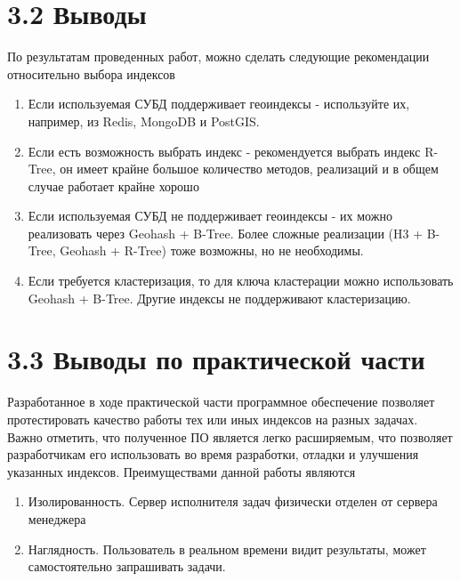 \section{3.2 Выводы}
По результатам проведенных работ, можно сделать следующие рекомендации относительно выбора индексов
\begin{enumerate}
    \item Если используемая СУБД поддерживает геоиндексы - используйте их, например, из Redis, MongoDB и PostGIS.
    \item Если есть возможность выбрать индекс - рекомендуется выбрать индекс R-Tree, он имеет крайне большое количество методов, реализаций и в общем случае работает крайне хорошо
    \item Если используемая СУБД не поддерживает геоиндексы - их можно реализовать через Geohash + B-Tree. Более сложные реализации (H3 + B-Tree, Geohash + R-Tree) тоже возможны, но не необходимы.
    \item Если требуется кластеризация, то для ключа кластерации можно использовать Geohash + B-Tree. Другие индексы не поддерживают кластеризацию.
\end{enumerate}

\section{3.3 Выводы по практической части}
Разработанное в ходе практической части программное обеспечение позволяет протестировать качество работы тех или иных индексов на разных задачах. Важно отметить, что полученное ПО является легко расширяемым, что позволяет разработчикам его использовать во время разработки, отладки и улучшения указанных индексов.
Преимуществами данной работы являются
\begin{enumerate}
    \item Изолированность. Сервер исполнителя задач физически отделен от сервера менеджера
    \item Наглядность. Пользователь в реальном времени видит результаты, может самостоятельно запрашивать задачи. 
\end{enumerate}